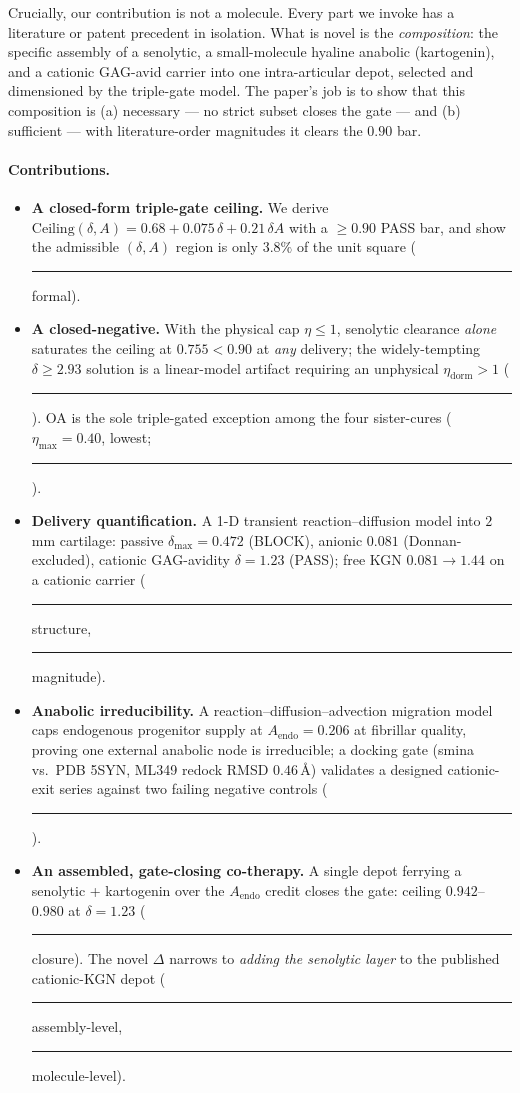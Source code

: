 \documentclass[11pt,a4paper]{article}
\newcommand{\tierdisc}[1]{\textcolor{#1}{\rule[0.05ex]{1.0ex}{1.0ex}}}
\newcommand{\tierBlue}{\tierdisc{blue!70!black}}   %
\newcommand{\tierGreen}{\tierdisc{green!60!black}} %
\newcommand{\tierOrange}{\tierdisc{orange!90!black}} %
\begin{document}
Crucially, our contribution is not a molecule. Every part we invoke has a
literature or patent precedent in isolation. What is novel is the
\emph{composition}: the specific assembly of a senolytic, a small-molecule
hyaline anabolic (kartogenin), and a cationic GAG-avid carrier into one
intra-articular depot, selected and dimensioned by the triple-gate model. The
paper's job is to show that this composition is (a) necessary --- no strict
subset closes the gate --- and (b) sufficient --- with literature-order magnitudes
it clears the $0.90$ bar.

\paragraph{Contributions.}
\begin{itemize}
  \item \textbf{A closed-form triple-gate ceiling.} We derive
  $\mathrm{Ceiling}(\delta,A)=0.68+0.075\,\delta+0.21\,\delta A$ with a $\ge0.90$
  PASS bar, and show the admissible $(\delta,A)$ region is only $3.8\%$ of the
  unit square (\tierBlue{} formal).
  \item \textbf{A closed-negative.} With the physical cap $\eta\le1$, senolytic
  clearance \emph{alone} saturates the ceiling at $0.755<0.90$ at \emph{any}
  delivery; the widely-tempting $\delta\ge2.93$ solution is a linear-model
  artifact requiring an unphysical $\eta_{\mathrm{dorm}}>1$ (\tierBlue{}). OA is the
  sole triple-gated exception among the four sister-cures ($\eta_{\max}=0.40$,
  lowest; \tierGreen{}).
  \item \textbf{Delivery quantification.} A 1-D transient reaction--diffusion
  model into $2$\,mm cartilage: passive $\delta_{\max}=0.472$ (BLOCK), anionic
  $0.081$ (Donnan-excluded), cationic GAG-avidity $\delta=1.23$ (PASS); free
  KGN $0.081\!\to\!1.44$ on a cationic carrier (\tierGreen{} structure,
  \tierOrange{} magnitude).
  \item \textbf{Anabolic irreducibility.} A reaction--diffusion--advection
  migration model caps endogenous progenitor supply at $A_{\mathrm{endo}}=0.206$
  at fibrillar quality, proving one external anabolic node is irreducible; a
  docking gate (smina vs.\ PDB 5SYN, ML349 redock RMSD $0.46$\,\AA) validates a
  designed cationic-exit series against two failing negative controls
  (\tierGreen{}).
  \item \textbf{An assembled, gate-closing co-therapy.} A single depot ferrying a
  senolytic + kartogenin over the $A_{\mathrm{endo}}$ credit closes the gate:
  ceiling $0.942$--$0.980$ at $\delta=1.23$ (\tierGreen{} closure). The novel
  $\Delta$ narrows to \emph{adding the senolytic layer} to the published
  cationic-KGN depot (\tierGreen{} assembly-level, \tierOrange{} molecule-level).
\end{itemize}
\end{document}
